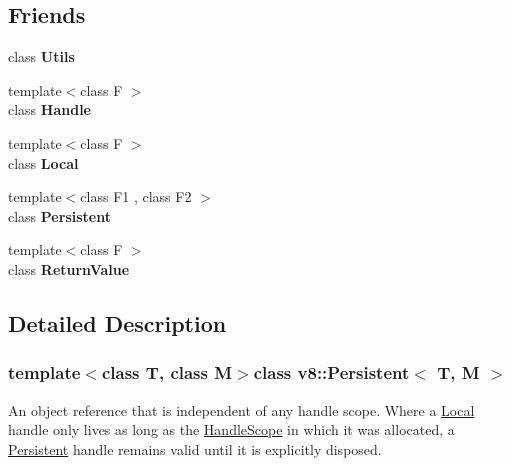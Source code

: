 \subsection*{Friends}
\begin{DoxyCompactItemize}
\item 
\hypertarget{classv8_1_1_persistent_abc0f7da619e9e72510dc07ed7b5ff6d8}{}class {\bfseries Utils}\label{classv8_1_1_persistent_abc0f7da619e9e72510dc07ed7b5ff6d8}

\item 
\hypertarget{classv8_1_1_persistent_a67ca1a2d91273eaf85fb3d23ba8ce984}{}{\footnotesize template$<$class F $>$ }\\class {\bfseries Handle}\label{classv8_1_1_persistent_a67ca1a2d91273eaf85fb3d23ba8ce984}

\item 
\hypertarget{classv8_1_1_persistent_afb872edb4aac7ba55f0da004113aa2b0}{}{\footnotesize template$<$class F $>$ }\\class {\bfseries Local}\label{classv8_1_1_persistent_afb872edb4aac7ba55f0da004113aa2b0}

\item 
\hypertarget{classv8_1_1_persistent_ad845ec8872174be0a9ca9a3dd1898d30}{}{\footnotesize template$<$class F1 , class F2 $>$ }\\class {\bfseries Persistent}\label{classv8_1_1_persistent_ad845ec8872174be0a9ca9a3dd1898d30}

\item 
\hypertarget{classv8_1_1_persistent_a53f604d3d6f2dc0647df33c9979f116a}{}{\footnotesize template$<$class F $>$ }\\class {\bfseries Return\+Value}\label{classv8_1_1_persistent_a53f604d3d6f2dc0647df33c9979f116a}

\end{DoxyCompactItemize}


\subsection{Detailed Description}
\subsubsection*{template$<$class T, class M$>$class v8\+::\+Persistent$<$ T, M $>$}

An object reference that is independent of any handle scope. Where a \hyperlink{classv8_1_1_local}{Local} handle only lives as long as the \hyperlink{classv8_1_1_handle_scope}{Handle\+Scope} in which it was allocated, a \hyperlink{classv8_1_1_persistent}{Persistent} handle remains valid until it is explicitly disposed.

